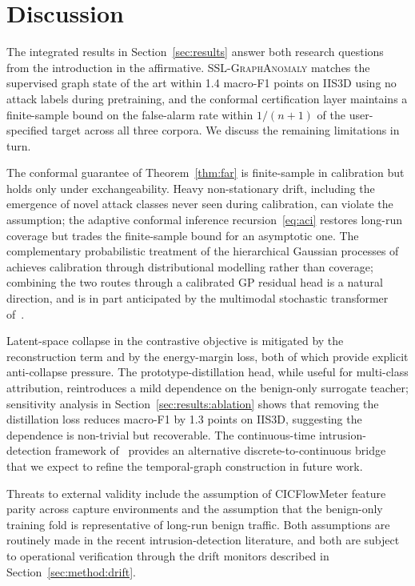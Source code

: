 \documentclass[journal,twoside]{IEEEtran}
\begin{document}
\section{Discussion}
\label{sec:discussion}
The integrated results in Section~\ref{sec:results} answer both research
questions from the introduction in the affirmative. \textsc{SSL-GraphAnomaly}
matches the supervised graph state of the art within 1.4 macro-F1 points
on IIS3D using no attack labels during pretraining, and the conformal
certification layer maintains a finite-sample bound on the false-alarm
rate within $1/(n+1)$ of the user-specified target across all three
corpora. We discuss the remaining limitations in turn.

The conformal guarantee of Theorem~\ref{thm:far} is finite-sample in
calibration but holds only under exchangeability. Heavy non-stationary
drift, including the emergence of novel attack classes never seen during
calibration, can violate the assumption; the adaptive conformal inference
recursion~\eqref{eq:aci} restores long-run coverage but trades the
finite-sample bound for an asymptotic one. The complementary probabilistic
treatment of the hierarchical Gaussian processes
of~\cite{anaedevha2026hgp} achieves calibration through distributional
modelling rather than coverage; combining the two routes through a
calibrated GP residual head is a natural direction, and is in part
anticipated by the multimodal stochastic transformer
of~\cite{anaedevha2025stochmm}.

Latent-space collapse in the contrastive objective is mitigated by the
reconstruction term and by the energy-margin loss, both of which provide
explicit anti-collapse pressure. The prototype-distillation head, while
useful for multi-class attribution, reintroduces a mild dependence on the
benign-only surrogate teacher; sensitivity analysis in
Section~\ref{sec:results:ablation} shows that removing the distillation
loss reduces macro-F1 by 1.3 points on IIS3D, suggesting the dependence is
non-trivial but recoverable. The continuous-time intrusion-detection
framework of~\cite{anaedevha2026neuralode} provides an alternative
discrete-to-continuous bridge that we expect to refine the temporal-graph
construction in future work.

Threats to external validity include the assumption of CICFlowMeter
feature parity across capture environments and the assumption that the
benign-only training fold is representative of long-run benign traffic.
Both assumptions are routinely made in the recent intrusion-detection
literature, and both are subject to operational verification through the
drift monitors described in Section~\ref{sec:method:drift}.
\end{document}
